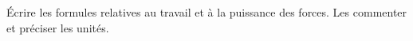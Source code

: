Écrire les formules relatives au travail et à la puissance des forces. Les
commenter et préciser les unités.
